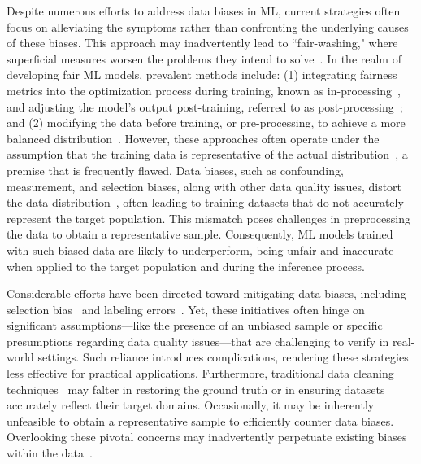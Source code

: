 \documentclass[11pt]{article}
\begin{document}
Despite numerous efforts to address data biases in ML, current strategies often focus on alleviating the symptoms rather than confronting the underlying causes of these biases. This approach may inadvertently lead to ``fair-washing," where superficial measures worsen the problems they intend to solve~\cite{zhu2023consistent}. In the realm of developing fair ML models, prevalent methods include: (1) integrating fairness metrics into the optimization process during training, known as in-processing~\cite{calders2010three,zhang2021omnifair,zhang2018mitigating,kearns,celis2019classification,kamishima2012fairness}, and adjusting the model’s output post-training, referred to as post-processing~\cite{pmlr-v65-woodworth17a,pleiss2017fairness,hardt2016equality,kamiran2012decision}; and (2) modifying the data before training, or pre-processing, to achieve a more balanced distribution~\cite{zemel2013learning,galhotra2022causal,salimi2019capuchin,calmon2017optimized,kamiran2012data}. However, these approaches often operate under the assumption that the training data is representative of the actual distribution~\cite{islam2022through}, a premise that is frequently flawed. Data biases, such as confounding, measurement, and selection biases, along with other data quality issues, distort the data distribution~\cite{neutatz2021cleaning, zhu2023consistent, mehrabi2021survey, chakraborty2021bias, olteanu2019social, gianfrancesco2018potential}, often leading to training datasets that do not accurately represent the target population. This mismatch poses challenges in preprocessing the data to obtain a representative sample. Consequently, ML models trained with such biased data are likely to underperform, being unfair and inaccurate when applied to the target population and during the inference process.


Considerable efforts have been directed toward mitigating data biases, including selection bias~\cite{huang2006correcting,cortes2008sample,liu2014robust,rezaei2020robust,du2021robust} and labeling errors~\cite{jiang2020identifying,zhang2023mitigating,zhang2023iflipper}. Yet, these initiatives often hinge on significant assumptions—like the presence of an unbiased sample or specific presumptions regarding data quality issues—that are challenging to verify in real-world settings. Such reliance introduces complications, rendering these strategies less effective for practical applications. Furthermore, traditional data cleaning techniques~\cite{mahdavi2020baran,DBLP:journals/pvldb/RekatsinasCIR17,krishnan2016activeclean,DBLP:journals/pvldb/KarlasLWGC0020} may falter in restoring the ground truth or in ensuring datasets accurately reflect their target domains. Occasionally, it may be inherently unfeasible to obtain a representative sample to efficiently counter data biases. Overlooking these pivotal concerns may inadvertently perpetuate existing biases within the data~\cite{schelter2021jenga,guhaautomated,neutatz2021cleaning}.
\end{document}

